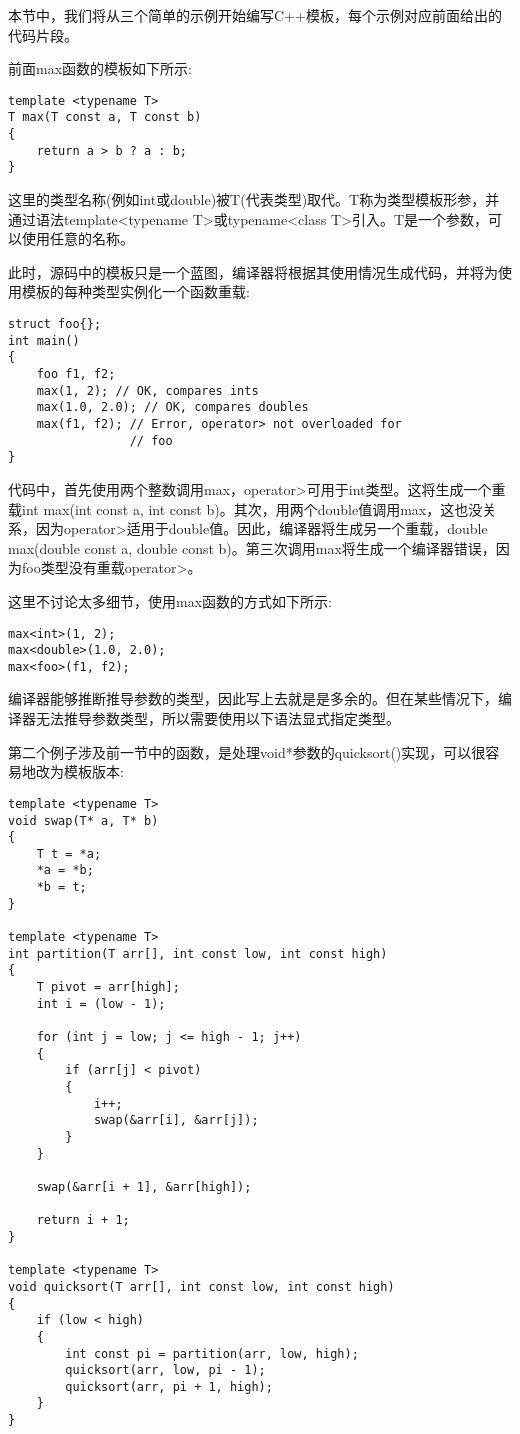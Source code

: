 本节中，我们将从三个简单的示例开始编写C++模板，每个示例对应前面给出的代码片段。

前面max函数的模板如下所示:

\begin{lstlisting}[style=styleCXX]
template <typename T>
T max(T const a, T const b)
{
	return a > b ? a : b;
}
\end{lstlisting}

这里的类型名称(例如int或double)被T(代表类型)取代。T称为类型模板形参，并通过语法template<typename T>或typename<class T>引入。T是一个参数，可以使用任意的名称。

此时，源码中的模板只是一个蓝图，编译器将根据其使用情况生成代码，并将为使用模板的每种类型实例化一个函数重载:

\begin{lstlisting}[style=styleCXX]
struct foo{};
int main()
{
	foo f1, f2;
	max(1, 2); // OK, compares ints
	max(1.0, 2.0); // OK, compares doubles
	max(f1, f2); // Error, operator> not overloaded for
	             // foo
}
\end{lstlisting}

代码中，首先使用两个整数调用max，operator>可用于int类型。这将生成一个重载int max(int const a, int const b)。其次，用两个double值调用max，这也没关系，因为operator>适用于double值。因此，编译器将生成另一个重载，double max(double const a, double const b)。第三次调用max将生成一个编译器错误，因为foo类型没有重载operator>。

这里不讨论太多细节，使用max函数的方式如下所示:

\begin{lstlisting}[style=styleCXX]
max<int>(1, 2);
max<double>(1.0, 2.0);
max<foo>(f1, f2);
\end{lstlisting}

编译器能够推断推导参数的类型，因此写上去就是是多余的。但在某些情况下，编译器无法推导参数类型，所以需要使用以下语法显式指定类型。

第二个例子涉及前一节中的函数，是处理void*参数的quicksort()实现，可以很容易地改为模板版本:

\begin{lstlisting}[style=styleCXX]
template <typename T>
void swap(T* a, T* b)
{
	T t = *a;
	*a = *b;
	*b = t;
}

template <typename T>
int partition(T arr[], int const low, int const high)
{
	T pivot = arr[high];
	int i = (low - 1);
	
	for (int j = low; j <= high - 1; j++)
	{
		if (arr[j] < pivot)
		{
			i++;
			swap(&arr[i], &arr[j]);
		}
	}

	swap(&arr[i + 1], &arr[high]);
	
	return i + 1;
}

template <typename T>
void quicksort(T arr[], int const low, int const high)
{
	if (low < high)
	{
		int const pi = partition(arr, low, high);
		quicksort(arr, low, pi - 1);
		quicksort(arr, pi + 1, high);
	}
}
\end{lstlisting}

